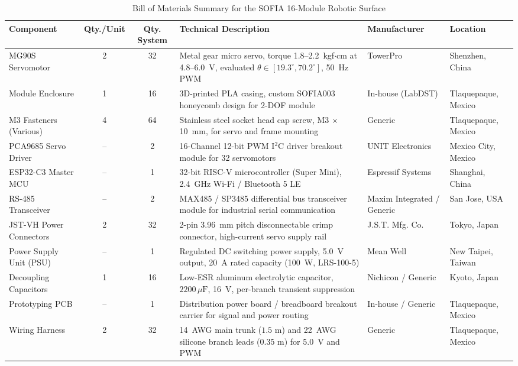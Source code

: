 \documentclass[lettersize,journal]{IEEEtran}
\begin{document}
	\begin{table}[!t]
		\centering
		\caption{Bill of Materials Summary for the SOFIA 16-Module Robotic Surface}
		\label{tab:bom_sofia}
		\scriptsize
		\renewcommand{\arraystretch}{0.86}
		\begin{tabular}{p{3.2cm} c c p{5.0cm} p{2.8cm} p{2.5cm}}
			\toprule
			\textbf{Component} & \textbf{Qty./Unit} & \textbf{Qty. System} & \textbf{Technical Description} & \textbf{Manufacturer} & \textbf{Location} \\
			\midrule
			MG90S Servomotor & 2 & 32 & Metal gear micro servo, torque 1.8--2.2~kgf$\cdot$cm at 4.8--6.0~V, evaluated $\theta \in [19.3^\circ, 70.2^\circ]$, 50~Hz PWM & TowerPro & Shenzhen, China \\
			Module Enclosure & 1 & 16 & 3D-printed PLA casing, custom SOFIA003 honeycomb design for 2-DOF module & In-house (LabDST) & Tlaquepaque, Mexico \\
			M3 Fasteners (Various) & 4 & 64 & Stainless steel socket head cap screw, M3 $\times$ 10~mm, for servo and frame mounting & Generic & Tlaquepaque, Mexico \\
			PCA9685 Servo Driver & -- & 2 & 16-Channel 12-bit PWM I$^2$C driver breakout module for 32 servomotors & UNIT Electronics & Mexico City, Mexico \\
			ESP32-C3 Master MCU & -- & 1 & 32-bit RISC-V microcontroller (Super Mini), 2.4~GHz Wi-Fi / Bluetooth 5 LE & Espressif Systems & Shanghai, China \\
			RS-485 Transceiver & -- & 2 & MAX485 / SP3485 differential bus transceiver module for industrial serial communication & Maxim Integrated / Generic & San Jose, USA \\
			JST-VH Power Connectors & 2 & 32 & 2-pin 3.96~mm pitch disconnectable crimp connector, high-current servo supply rail & J.S.T. Mfg. Co. & Tokyo, Japan \\
			Power Supply Unit (PSU) & -- & 1 & Regulated DC switching power supply, 5.0~V output, 20~A rated capacity (100~W, LRS-100-5) & Mean Well & New Taipei, Taiwan \\
			Decoupling Capacitors & 1 & 16 & Low-ESR aluminum electrolytic capacitor, $2200\,\mu\text{F}$, 16~V, per-branch transient suppression & Nichicon / Generic & Kyoto, Japan \\
			Prototyping PCB & -- & 1 & Distribution power board / breadboard breakout carrier for signal and power routing & In-house / Generic & Tlaquepaque, Mexico \\
			Wiring Harness & 2 & 32 & 14~AWG main trunk ($1.5\text{ m}$) and 22~AWG silicone branch leads ($0.35\text{ m}$) for 5.0~V and PWM & Generic & Tlaquepaque, Mexico \\

\end{tabular}
\end{table}
\end{document}
